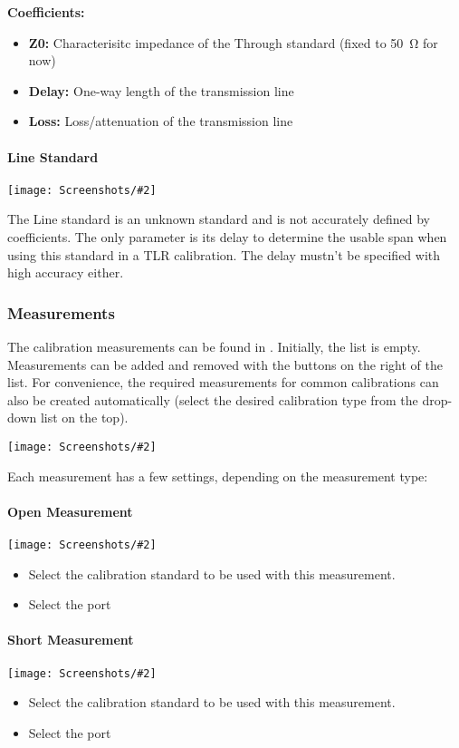 \documentclass[a4paper,11pt]{article}
\newcommand{\screenshot}[2]{\begin{center}
\texttt{[image: Screenshots/\#2]}
\end{center}}
\begin{document}
\textbf{Coefficients:}
\begin{itemize}
\item \textbf{Z0:} Characterisitc impedance of the Through standard (fixed to \SI{50}{\ohm} for now)
\item \textbf{Delay:} One-way length of the transmission line
\item \textbf{Loss:} Loss/attenuation of the transmission line
\end{itemize}

\paragraph{Line Standard}
\screenshot{0.5}{LineStandardDialog.png}
The Line standard is an unknown standard and is not accurately defined by coefficients. The only parameter is its delay to determine the usable span when using this standard in a TLR calibration. The delay mustn't be specified with high accuracy either.


\subsubsection{Measurements}
\label{vna:cal:meas}
The calibration measurements can be found in . Initially, the list is empty. Measurements can be added and removed with the buttons on the right of the list. For convenience, the required measurements for common calibrations can also be created automatically (select the desired calibration type from the drop-down list on the top).

\screenshot{1.0}{CalibrationMeasurements.png}

Each measurement has a few settings, depending on the measurement type:

\paragraph{Open Measurement}
\screenshot{1.0}{OpenMeasurement.png}
\begin{itemize}
\item Select the calibration standard to be used with this measurement.
\item Select the port
\end{itemize}

\paragraph{Short Measurement}
\screenshot{1.0}{ShortMeasurement.png}
\begin{itemize}
\item Select the calibration standard to be used with this measurement.
\item Select the port
\end{itemize}
\end{document}
